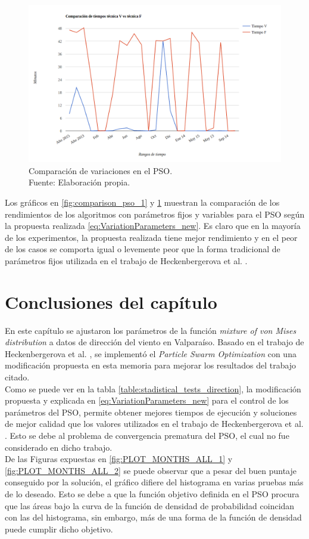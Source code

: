 \begin{figure}[ht!]
    \centering
    \captionsetup{justification=centering,margin=2cm}
        \includegraphics[width=\textwidth]{figures/comp_v1_v2_tiempo.png}   
    \caption{Comparación de variaciones en el PSO.\\ Fuente: Elaboración propia.}
    \label{fig:comparison_pso_2}
\end{figure}
Los gráficos en \ref{fig:comparison_pso_1} y  \ref{fig:comparison_pso_2} muestran la comparación de los rendimientos de los algoritmos con parámetros fijos y variables para el PSO según la propuesta realizada \ref{eq:VariationParameters_new}. Es claro que en la mayoría de los experimentos, la propuesta realizada tiene mejor rendimiento y en el peor de los casos se comporta igual o levemente peor que la forma tradicional de parámetros fijos utilizada en el trabajo de Heckenbergerova et al. \cite{Heckenbergerova15}.
\newpage
\section{Conclusiones del capítulo}
En este capítulo se ajustaron los parámetros de la función \emph{mixture of von Mises distribution} a datos de dirección del viento en Valparaíso. Basado en el trabajo de Heckenbergerova et al. \cite{Heckenbergerova15}, se implementó el \emph{Particle Swarm Optimization} con una modificación propuesta en esta memoria para mejorar los resultados del trabajo citado.\\
Como se puede ver en la tabla \ref{table:stadistical_tests_direction}, la modificación propuesta y explicada en \ref{eq:VariationParameters_new} para el control de los parámetros del PSO, permite obtener mejores tiempos de ejecución y soluciones de mejor calidad que los valores utilizados en el trabajo de Heckenbergerova et al. \cite{Heckenbergerova15}. Esto se debe al problema de convergencia prematura del PSO, el cual no fue considerado en dicho trabajo. \\
De las Figuras expuestas en \ref{fig:PLOT_MONTHS_ALL_1} y \ref{fig:PLOT_MONTHS_ALL_2} se puede observar que a pesar del buen puntaje conseguido por la solución, el gráfico difiere del histograma en varias pruebas más de lo deseado. Esto se debe a que la función objetivo definida en el PSO procura que las áreas bajo la curva de la función de densidad de probabilidad coincidan con las del histograma, sin embargo, más de una forma de la función de densidad puede cumplir dicho objetivo.